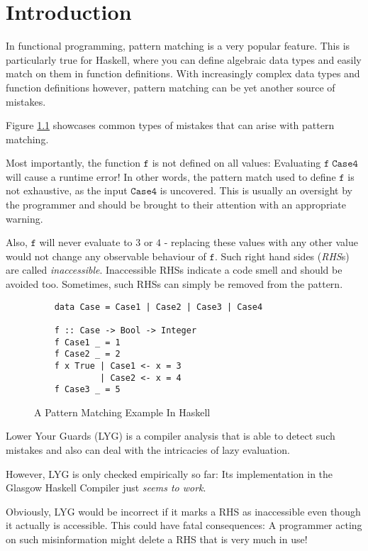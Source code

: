 \chapter{Introduction}\label{sec:intro}

In functional programming, pattern matching is a very popular feature.
This is particularly true for Haskell, where you can define algebraic data types
and easily match on them in function definitions.
With increasingly complex data types and function definitions however,
pattern matching can be yet another source of mistakes.

Figure \ref{lst:haskell} showcases common types of mistakes that can arise with pattern matching.

Most importantly, the function $\mathtt{f}$ is not defined on all values:
Evaluating $\mathtt{f}\;\mathtt{Case4}$ will cause a runtime error!
In other words, the pattern match used to define $\mathtt{f}$ is not exhaustive,
as the input $\mathtt{Case4}$ is uncovered.
This is usually an oversight by the programmer and should be brought to their attention with an appropriate warning.

Also, $\mathtt{f}$ will never evaluate to $3$ or $4$ - replacing these values with any other value would not change any observable behaviour of $\mathtt{f}$. Such right hand sides (\textit{RHS}s) are called \textit{inaccessible}.
Inaccessible RHSs indicate a code smell and should be avoided too. Sometimes, such RHSs can simply be removed from the pattern.

\begin{figure}[htbp]
	\caption{A Pattern Matching Example In Haskell}
	\label{lst:haskell}
    \begin{verbatim}
    data Case = Case1 | Case2 | Case3 | Case4
    
    f :: Case -> Bool -> Integer
    f Case1 _ = 1
    f Case2 _ = 2
    f x True | Case1 <- x = 3
             | Case2 <- x = 4
    f Case3 _ = 5
    \end{verbatim}
\end{figure}


Lower Your Guards (LYG) \cite{10.1145/3408989} is a compiler analysis that is able to detect such mistakes and also can deal with the intricacies of lazy evaluation.

However, LYG is only checked empirically so far: Its implementation in the Glasgow Haskell Compiler just \textit{seems to work}.

Obviously, LYG would be incorrect if it marks a RHS as inaccessible even though it actually
is accessible. This could have fatal consequences: A programmer acting on such misinformation
might delete a RHS that is very much in use!

